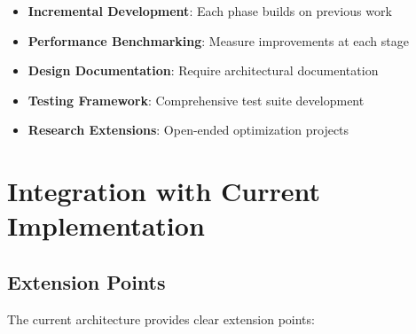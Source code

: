 \documentclass[12pt,a4paper]{article}
\begin{document}
\begin{itemize}
    \item \textbf{Incremental Development}: Each phase builds on previous work
    \item \textbf{Performance Benchmarking}: Measure improvements at each stage
    \item \textbf{Design Documentation}: Require architectural documentation
    \item \textbf{Testing Framework}: Comprehensive test suite development
    \item \textbf{Research Extensions}: Open-ended optimization projects
\end{itemize}

\section{Integration with Current Implementation}

\subsection{Extension Points}

The current architecture provides clear extension points:
\end{document}
